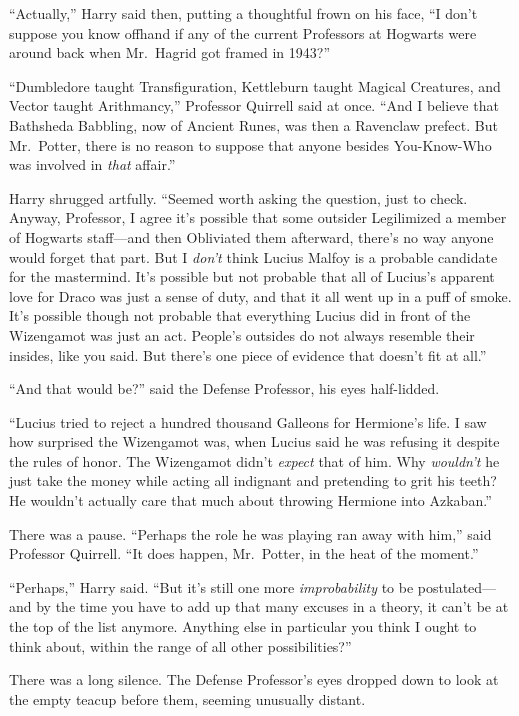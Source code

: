 “Actually,” Harry said then, putting a thoughtful frown on his face, “I don’t suppose you know offhand if any of the current Professors at Hogwarts were around back when Mr.~Hagrid got framed in 1943?”

“Dumbledore taught Transfiguration, Kettleburn taught Magical Creatures, and Vector taught Arithmancy,” Professor Quirrell said at once. “And I believe that Bathsheda Babbling, now of Ancient Runes, was then a Ravenclaw prefect. But Mr.~Potter, there is no reason to suppose that anyone besides You-Know-Who was involved in \emph{that} affair.”

Harry shrugged artfully. “Seemed worth asking the question, just to check. Anyway, Professor, I agree it’s possible that some outsider Legilimized a member of Hogwarts staff—and then Obliviated them afterward, there’s no way anyone would forget that part. But I \emph{don’t} think Lucius Malfoy is a probable candidate for the mastermind. It’s possible but not probable that all of Lucius’s apparent love for Draco was just a sense of duty, and that it all went up in a puff of smoke. It’s possible though not probable that everything Lucius did in front of the Wizengamot was just an act. People’s outsides do not always resemble their insides, like you said. But there’s one piece of evidence that doesn’t fit at all.”

“And that would be?” said the Defense Professor, his eyes half-lidded.

“Lucius tried to reject a hundred thousand Galleons for Hermione’s life. I saw how surprised the Wizengamot was, when Lucius said he was refusing it despite the rules of honor. The Wizengamot didn’t \emph{expect} that of him. Why \emph{wouldn’t} he just take the money while acting all indignant and pretending to grit his teeth? He wouldn’t actually care that much about throwing Hermione into Azkaban.”

There was a pause. “Perhaps the role he was playing ran away with him,” said Professor Quirrell. “It does happen, Mr.~Potter, in the heat of the moment.”

“Perhaps,” Harry said. “But it’s still one more \emph{improbability} to be postulated—and by the time you have to add up that many excuses in a theory, it can’t be at the top of the list anymore. Anything else in particular you think I ought to think about, within the range of all other possibilities?”

There was a long silence. The Defense Professor’s eyes dropped down to look at the empty teacup before them, seeming unusually distant.

